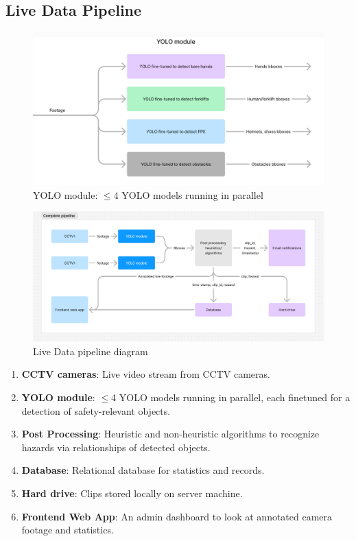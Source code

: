 \documentclass[12pt]{article}
\begin{document}
\subsection{Live Data Pipeline}
\begin{figure}[H]
    \centering
    \includegraphics[width=\textwidth]{yolo_module.png}
    \caption{YOLO module: $\leq4$ YOLO models running in parallel}
    \label{fig:yolo}
\end{figure}

\begin{figure}[H]
    \centering
    \includegraphics[width=\textwidth]{complete_pipeline.png}
    \caption{Live Data pipeline diagram}
    \label{fig:pipeline2}
\end{figure}

\begin{enumerate}
    \item \textbf{CCTV cameras}: Live video stream from CCTV cameras.
    \item \textbf{YOLO module}: $\leq$4 YOLO models running in parallel, each finetuned for a detection of safety-relevant objects.
    \item \textbf{Post Processing}: Heuristic and non-heuristic algorithms to recognize hazards via relationships of detected objects.
    \item \textbf{Database}: Relational database for statistics and records.
    \item \textbf{Hard drive}: Clips stored locally on server machine.
    \item \textbf{Frontend Web App}: An admin dashboard to look at annotated camera footage and statistics.
\end{enumerate}
\end{document}
